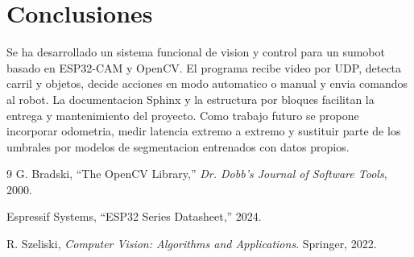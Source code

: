 \documentclass[10pt,a4paper,twocolumn]{article}
\begin{document}
\section{Conclusiones}

Se ha desarrollado un sistema funcional de vision y control para un sumobot
basado en ESP32-CAM y OpenCV. El programa recibe video por UDP, detecta carril
y objetos, decide acciones en modo automatico o manual y envia comandos al
robot. La documentacion Sphinx y la estructura por bloques facilitan la entrega
y mantenimiento del proyecto. Como trabajo futuro se propone incorporar
odometria, medir latencia extremo a extremo y sustituir parte de los umbrales
por modelos de segmentacion entrenados con datos propios.

\begin{thebibliography}{9}
G. Bradski, ``The OpenCV Library,'' \emph{Dr. Dobb's Journal of Software
Tools}, 2000.

Espressif Systems, ``ESP32 Series Datasheet,'' 2024.

R. Szeliski, \emph{Computer Vision: Algorithms and Applications}. Springer,
2022.
\end{thebibliography}
\end{document}
